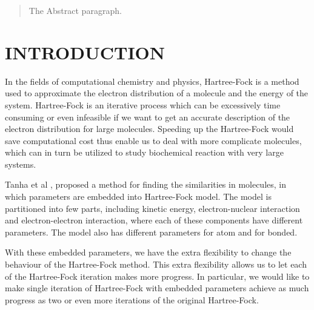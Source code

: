 \documentclass[twoside]{article}
\begin{document}
%

%


\begin{abstract}
  The Abstract paragraph.
\end{abstract}

\section{INTRODUCTION}
In the fields of computational chemistry and physics, Hartree-Fock is a method used to approximate the electron distribution of a molecule and the energy of the system. Hartree-Fock is an iterative process which can be excessively time consuming or even infeasible if we want to get an accurate description of the electron distribution for large molecules. Speeding up the Hartree-Fock would save computational cost thus enable us to deal with more complicate molecules, which can in turn be utilized to study biochemical reaction with very large systems. 

Tanha et al \cite{Matteus}, proposed a method for finding the similarities in molecules, in which parameters are embedded into Hartree-Fock model. The model is partitioned into few parts, including  kinetic energy, electron-nuclear interaction and electron-electron interaction, where each of these components have different parameters. The model also has different parameters for atom and for bonded.

With these embedded parameters,  we have the extra flexibility to change the behaviour of the Hartree-Fock method. This extra flexibility allows us to let each of the Hartree-Fock iteration makes more progress. In particular, we would like to make single iteration of Hartree-Fock with embedded parameters achieve as much progress as two or even more iterations of the original Hartree-Fock.
\end{document}
